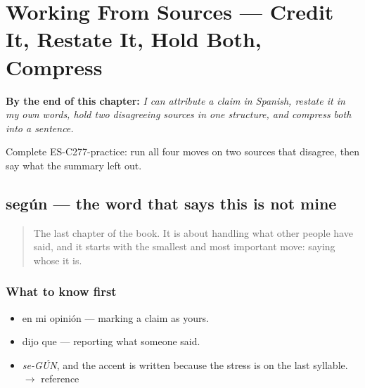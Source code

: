 
\chapter{Working From Sources --- Credit It, Restate It, Hold Both, Compress}
\label{ch:fuentes}

\begin{chapteropening}
\textbf{By the end of this chapter:} \emph{I can attribute a claim in Spanish, restate it in my own words, hold two disagreeing sources in one structure, and compress both into a sentence.}

Complete ES-C277-practice: run all four moves on two sources that disagree, then say what the summary left out.
\end{chapteropening}

\section[según]{según — the word that says this is not mine}

\label{lesson:ES-C277-segun}



\begin{quote}
The last chapter of the book. It is about handling what other people have said, and it starts with the smallest and most important move: saying whose it is.
\end{quote}

\subsection*{What to know first}
\begin{itemize}
\raggedright
  \item en mi opinión — marking a claim as yours.
  \item dijo que — reporting what someone said.
\end{itemize}

\begin{sounds}
\begin{itemize}
\raggedright
  \item \emph{se-GÚN}, and the accent is written because the stress is on the last syllable. $\to$ reference
\end{itemize}
\end{sounds}

